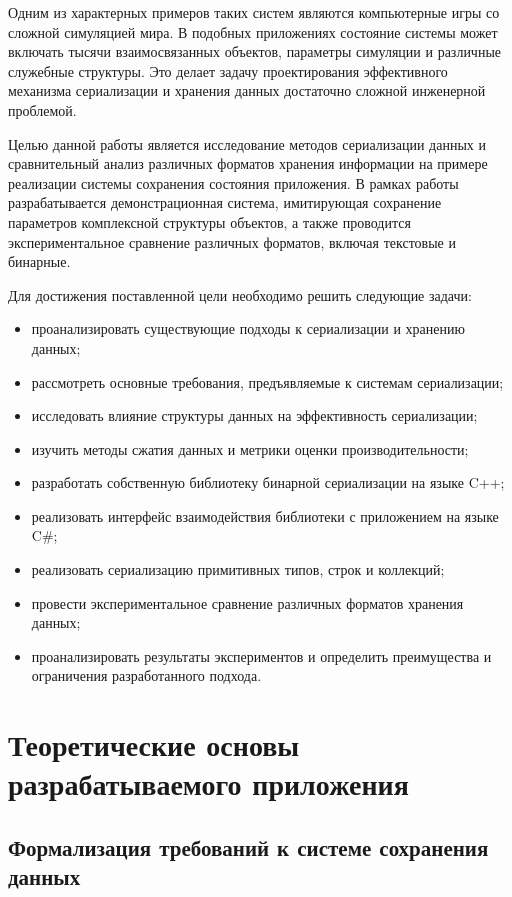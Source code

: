 \documentclass[coursework]{SCWorks}
\begin{document}
Одним из характерных примеров таких систем являются компьютерные игры со сложной симуляцией мира. В подобных приложениях состояние системы может включать тысячи взаимосвязанных объектов, параметры симуляции и различные служебные структуры. Это делает задачу проектирования эффективного механизма сериализации и хранения данных достаточно сложной инженерной проблемой.

Целью данной работы является исследование методов сериализации данных и сравнительный анализ различных форматов хранения информации на примере реализации системы сохранения состояния приложения. В рамках работы разрабатывается демонстрационная система, имитирующая сохранение параметров комплексной структуры объектов, а также проводится экспериментальное сравнение различных форматов, включая текстовые и бинарные.

Для достижения поставленной цели необходимо решить следующие задачи:
\begin{itemize}
\item проанализировать существующие подходы к сериализации и хранению данных;
\item рассмотреть основные требования, предъявляемые к системам сериализации;
\item исследовать влияние структуры данных на эффективность сериализации;
\item изучить методы сжатия данных и метрики оценки производительности;
\item разработать собственную библиотеку бинарной сериализации на языке C++;
\item реализовать интерфейс взаимодействия библиотеки с приложением на языке C\#;
\item реализовать сериализацию примитивных типов, строк и коллекций;
\item провести экспериментальное сравнение различных форматов хранения данных;
\item проанализировать результаты экспериментов и определить преимущества и ограничения разработанного подхода.
\end{itemize}

\section{Теоретические основы разрабатываемого приложения}

\subsection{Формализация требований к системе сохранения данных}
\end{document}
